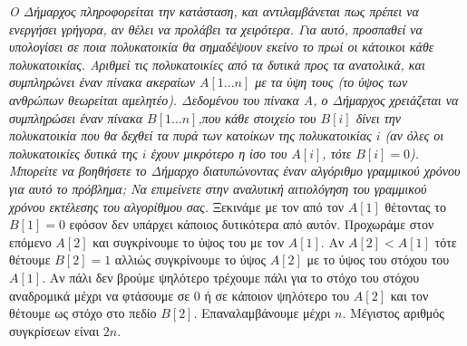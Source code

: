 \documentclass[a4paper,10pt]{article} \usepackage{anysize}
\begin{document}
\textit{Ο Δήμαρχος πληροφορείται την κατάσταση, και αντιλαμβάνεται πως πρέπει
να ενεργήσει γρήγορα, αν θέλει να προλάβει τα χειρότερα. Για αυτό, προσπαθεί
να υπολογίσει σε ποια πολυκατοικία θα σημαδέψουν εκείνο το πρωί οι κάτοικοι
κάθε πολυκατοικίας. Αριθμεί τις πολυκατοικίες από τα δυτικά προς τα ανατολικά,
και συμπληρώνει έναν πίνακα ακεραίων $A[1...n]$ με τα ύψη τους (το ύψος των
ανθρώπων θεωρείται αμελητέο). Δεδομένου του πίνακα Α, ο Δήμαρχος χρειάζεται να
συμπληρώσει έναν πίνακα $B[1...n]$,που κάθε στοιχείο του $B[i]$ δίνει την
πολυκατοικία που θα δεχθεί τα πυρά των κατοίκων της πολυκατοικίας $i$ (αν όλες
οι πολυκατοικίες δυτικά της $i$ έχουν μικρότερο η ίσο του $A[i]$, τότε
$B[i]=0$). Μπορείτε να βοηθήσετε το Δήμαρχο διατυπώνοντας έναν αλγόριθμο
γραμμικού χρόνου για αυτό το πρόβλημα; Να επιμείνετε στην αναλυτική
αιτιολόγηση του γραμμικού χρόνου εκτέλεσης του αλγορίθμου σας.}
\vspace{0.4cm}
Ξεκινάμε με τον από τον $A[1]$ θέτοντας το $B[1]=0$ εφόσον δεν υπάρχει κάποιος
δυτικότερα από αυτόν. Προχωράμε στον επόμενο $A[2]$ και συγκρίνουμε το ύψος
του με τον $A[1]$. Αν $A[2]<A[1]$ τότε θέτουμε $B[2]=1$ αλλιώς συγκρίνουμε το
ύψος $A[2]$ με το ύψος του στόχου του $A[1]$. Αν πάλι δεν βρούμε ψηλότερο
τρέχουμε πάλι για το στόχο του στόχου αναδρομικά μέχρι να φτάσουμε σε 0
ή σε κάποιον ψηλότερο του $A[2]$ και τον θέτουμε ως στόχο στο πεδίο $B[2]$.
Επαναλαμβάνουμε μέχρι $n$. Μέγιστος αριθμός συγκρίσεων είναι $2n$.
\end{document}
